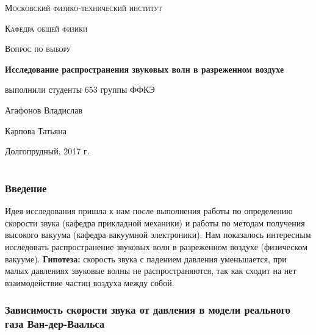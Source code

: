 \documentclass[a4paper,12pt]{article}
\begin{document}
\begin{titlepage}
	\centering
	\vspace{5cm}
	{\scshape\LARGE Московский физико-технический институт \par}
	\vspace{1cm}
	{\scshape\Large Кафедра общей физики \par}
	\vspace{4cm}
	{\scshape\Large Вопрос по выбору \par}
	\vspace{1cm}
	{\huge\bfseries Исследование распространения звуковых волн в разреженном воздухе \par}
	\vspace{1cm}
	\vfill
\begin{flushright}
	{\large выполнили студенты 653 группы ФФКЭ}\par
	\vspace{0.3cm}
	{\LARGE Агафонов Владислав}\par
	\vspace{0.3cm}
	{\LARGE Карпова Татьяна}
\end{flushright}
	

	\vfill

	Долгопрудный, 2017 г.
\end{titlepage}

\part{}
\section{Введение}

Идея исследования пришла к нам после выполнения работы по определению скорости звука (кафедра прикладной механики) и работы по методам получения высокого вакуума (кафедра вакуумной электроники). Нам показалось интересным исследовать распространение звуковых волн в разреженном воздухе (физическом вакууме). \textbf{Гипотеза:} скорость звука с падением давления уменьшается, при малых давлениях звуковые волны не распространяются, так как сходит на нет взаимодействие частиц воздуха между собой.

\section{Зависимость скорости звука от давления в модели реального газа Ван-дер-Ваальса}
\end{document}
